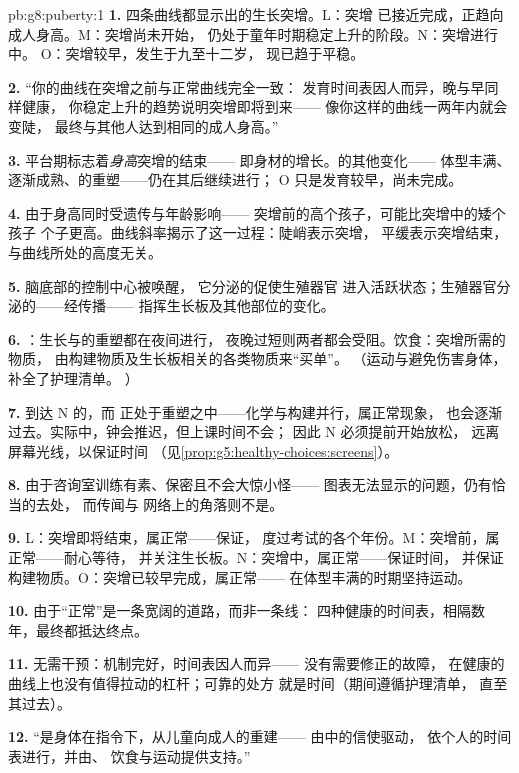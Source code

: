 \begin{solution}{pb:g8:puberty:1}
\textbf{1.} 四条曲线都显示出的生长突增。L：突增
已接近完成，正趋向成人身高。M：突增尚未开始，
仍处于童年时期稳定上升的阶段。N：突增进行中。
O：突增较早，发生于九至十二岁，
现已趋于平稳。

\textbf{2.} “你的曲线在突增之前与正常曲线完全一致：
发育时间表因人而异，晚与早同样健康，
你稳定上升的趋势说明突增即将到来——
像你这样的曲线一两年内就会变陡，
最终与其他人达到相同的成人身高。”

\textbf{3.} 平台期标志着\emph{身高}突增的结束——
即身材的增长。的其他变化——
体型丰满、逐渐成熟、的重塑——仍在其后继续进行；
O 只是发育较早，尚未完成。

\textbf{4.} 由于身高同时受遗传与年龄影响——
突增前的高个孩子，可能比突增中的矮个孩子
个子更高。曲线斜率揭示了这一过程：陡峭表示突增，
平缓表示突增结束，与曲线所处的高度无关。

\textbf{5.} 脑底部的控制中心被唤醒，
它分泌的促使生殖器官
进入活跃状态；生殖器官分泌的——经传播——
指挥生长板及其他部位的变化。

\textbf{6.} ：生长与的重塑都在夜间进行，
夜晚过短则两者都会受阻。饮食：突增所需的物质，
由构建物质及生长板相关的各类物质来“买单”。
（运动与避免伤害身体，补全了护理清单。
）

\textbf{7.} 到达 N 的，而
正处于重塑之中——化学与构建并行，属正常现象，
也会逐渐过去。实际中，钟会推迟，但上课时间不会；
因此 N 必须提前开始放松，
远离屏幕光线，以保证时间
（见\cref{prop:g5:healthy-choices:screens}）。

\textbf{8.} 由于咨询室训练有素、保密且不会大惊小怪——
图表无法显示的问题，仍有恰当的去处，
而传闻与
网络上的角落则不是。

\textbf{9.} L：突增即将结束，属正常——保证，
度过考试的各个年份。M：突增前，属正常——耐心等待，
并关注生长板。N：突增中，属正常——保证时间，
并保证构建物质。O：突增已较早完成，属正常——
在体型丰满的时期坚持运动。

\textbf{10.} 由于“正常”是一条宽阔的道路，而非一条线：
四种健康的时间表，相隔数年，最终都抵达终点。

\textbf{11.} 无需干预：机制完好，时间表因人而异——
没有需要修正的故障，
在健康的曲线上也没有值得拉动的杠杆；可靠的处方
就是时间（期间遵循护理清单，
直至其过去）。

\textbf{12.} “是身体在指令下，从儿童向成人的重建——
由中的信使驱动，
依个人的时间表进行，并由、
饮食与运动提供支持。”
\end{solution}
